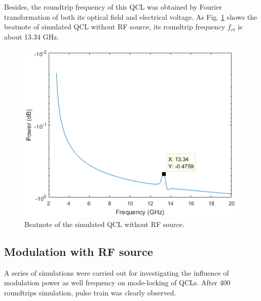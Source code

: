 \documentclass[11pt,final]{scrbook}
\begin{document}
Besides, the roundtrip frequency of this QCL was obtained by Fourier transformation of both its optical field and electrical voltage. As Fig. \ref{fig:beatnote_noRF} shows the beatnote of simulated QCL without RF source, its roundtrip frequency $f_{rt}$ is about 13.34 GHz.
\begin{figure}[htbp]
\begin{center}
\includegraphics[scale=0.8]{images/beatnote_noRF.pdf}
\caption{Beatnote of the simulated QCL without RF source.}
\label{fig:beatnote_noRF}
\end{center}
\end{figure}

\subsection{Modulation with RF source} 
A series of simulations were carried out for investigating the influence of modulation power as well frequency on mode-locking of QCLs. After 400 roundtrips simulation, pulse train was clearly observed.
\end{document}
